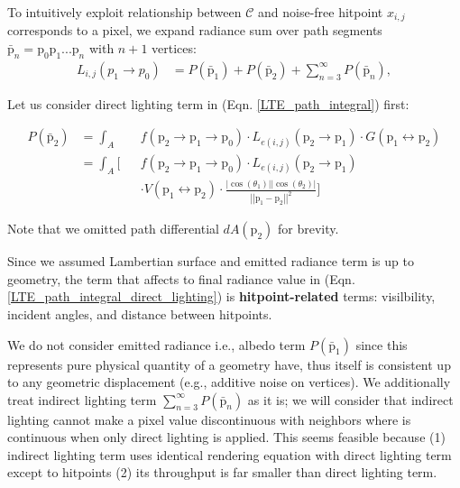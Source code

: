 To intuitively exploit relationship between $\mathcal{C}$ and noise-free hitpoint $x_{i,j}$ corresponds to a pixel, we expand radiance sum over path segments $\bar{\mathrm{p}}_n=\mathrm{p}_0\mathrm{p}_1...\mathrm{p}_n$ with $n+1$ vertices:
\begin{align}
    L_{i,j}\left(p_1\rightarrow p_0\right)& = \mathit{P}\left(\bar{\mathrm{p}}_1\right)+\mathit{P}\left(\bar{\mathrm{p}}_2\right)+\sum_{n=3}^\infty \mathit{P}\left(\bar{\mathrm{p}}_n\right), 
    \label{LTE_path_integral}
\end{align}


Let us consider direct lighting term in (Eqn. \ref{LTE_path_integral}) first:

\begin{align}
    \mathit{P}\left(\bar{\mathrm{p}}_2\right) & = \int_A && f\left(\mathrm{p}_2\rightarrow \mathrm{p}_1 \rightarrow \mathrm{p}_0\right)\cdot L_{e(i,j)}\left(\mathrm{p}_2\rightarrow \mathrm{p}_1\right) \cdot G\left(\mathrm{p}_1 \leftrightarrow \mathrm{p}_2\right) \nonumber \\
    & = \int_A \Bigg[ && f\left(\mathrm{p}_2\rightarrow \mathrm{p}_1 \rightarrow \mathrm{p}_0\right)\cdot L_{e(i,j)}(\mathrm{p}_2\rightarrow \mathrm{p}_1) \nonumber \\ 
    & && \cdot V(\mathrm{p}_1 \leftrightarrow \mathrm{p}_2) \cdot \frac{\left|\cos(\theta_1)\right|\left|\cos(\theta_2)\right|}{\left|\left|\mathrm{p}_1-\mathrm{p}_2\right|\right|^2}\Bigg]
    \label{LTE_path_integral_direct_lighting}
\end{align}

Note that we omitted path differential $dA(\mathrm{p}_2)$ for brevity.

Since we assumed Lambertian surface and emitted radiance term is up to geometry, the term that affects to final radiance value in (Eqn. \ref{LTE_path_integral_direct_lighting}) is \textbf{hitpoint-related} terms: visilbility, incident angles, and distance between hitpoints.

We do not consider emitted radiance i.e., albedo term $\mathit{P}\left(\bar{\mathrm{p}}_1\right)$ since this represents pure physical quantity of a geometry have, thus itself is consistent up to any geometric displacement (e.g., additive noise on vertices).
We additionally treat indirect lighting term $\sum_{n=3}^\infty \mathit{P}(\bar{\mathrm{p}}_n)$ as it is; we will consider that indirect lighting cannot make a pixel value discontinuous with neighbors where is continuous when only direct lighting is applied. 
This seems feasible because (1) indirect lighting term uses identical rendering equation with direct lighting term except to hitpoints (2) its throughput is far smaller than direct lighting term.


